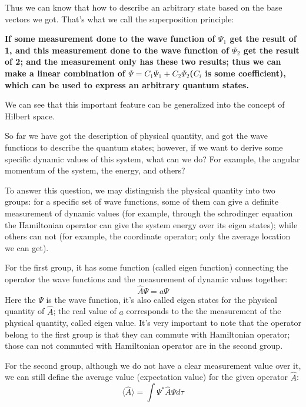 Thus we can know that how to describe an arbitrary state based on
the base vectors we got. That's what we call the superposition
principle:
\begin{law}
\textbf{ If some measurement done to the wave function of $\Psi_{1}$
get the result of 1, and this measurement done to the wave function
of $\Psi_{2}$ get the result of 2; and the measurement only has
these two results; thus we can make a linear combination of $\Psi =
C_{1}\Psi_{1} + C_{2}\Psi_{2}$($C_{i}$ is some coefficient), which
can be used to express an arbitrary quantum states.}
\end{law}
We can see that this important feature can be generalized into the
concept of Hilbert space.

So far we have got the description of physical quantity, and got the
wave functions to describe the quantum states; however, if we want
to derive some specific dynamic values of this system, what can we
do? For example, the angular momentum of the system, the energy, and
others?

To answer this question, we may distinguish the physical quantity
into two groups: for a specific set of wave functions, some of them
can give a definite measurement of dynamic values (for example,
through the schrodinger equation the Hamiltonian operator can give
the system energy over its eigen states); while others can not (for
example, the coordinate operator; only the average location we can
get).

For the first group, it has some function (called eigen function)
connecting the operator the wave functions and the measurement of
dynamic values together:
\begin{equation}\label{}
\hat{A}\Psi = a\Psi
\end{equation}
Here the $\Psi$ is the wave function, it's also called eigen states
for the physical quantity of $\hat{A}$; the real value of $a$
corresponds to the the measurement of the physical quantity, called
eigen value. It's very important to note that the operator belong to
the first group is that they can commute with Hamiltonian operator;
those can not commuted with Hamiltonian operator are in the second
group.

For the second group, although we do not have a clear measurement
value over it, we can still define the average value (expectation
value) for the given operator $\hat{A}$:
\begin{equation}\label{}
\langle\hat{A}\rangle = \int \Psi^{*}\hat{A}\Psi d\tau
\end{equation}

